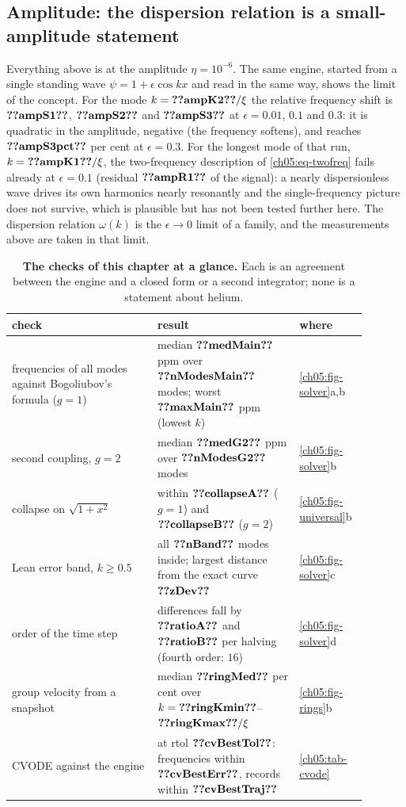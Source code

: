 \subsection{Amplitude: the dispersion relation is a small-amplitude statement}
Everything above is at the amplitude $\eta=10^{-6}$.
The same engine, started from a single standing wave $\psi=1+\epsilon\cos kx$ and read in the same way, shows the limit of the concept.
For the mode $k=\cfiveV{ampK2}/\xi$ the relative frequency shift is $\cfiveV{ampS1}$, $\cfiveV{ampS2}$ and $\cfiveV{ampS3}$ at $\epsilon=0.01$, $0.1$ and $0.3$: it is quadratic in the amplitude, negative (the frequency softens), and reaches $\cfiveV{ampS3pct}$ per cent at $\epsilon=0.3$.
For the longest mode of that run, $k=\cfiveV{ampK1}/\xi$, the two-frequency description of \cref{ch05:eq-twofreq} fails already at $\epsilon=0.1$ (residual $\cfiveV{ampR1}$ of the signal): a nearly dispersionless wave drives its own harmonics nearly resonantly and the single-frequency picture does not survive, which is plausible but has not been tested further here.
The dispersion relation $\omega(k)$ is the $\epsilon\to0$ limit of a family, and the measurements above are taken in that limit.

\begin{table}[tp]
\centering\small
\begin{tabular}{p{0.38\linewidth}p{0.37\linewidth}p{0.14\linewidth}}\toprule
check & result & where\\\midrule
frequencies of all modes against Bogoliubov's formula ($g=1$) & median $\cfiveV{medMain}$ ppm over $\cfiveV{nModesMain}$ modes; worst $\cfiveV{maxMain}$ ppm (lowest $k$) & \cref{ch05:fig-solver}a,b\\
second coupling, $g=2$ & median $\cfiveV{medG2}$ ppm over $\cfiveV{nModesG2}$ modes & \cref{ch05:fig-solver}b\\
collapse on $\sqrt{1+x^2}$ & within $\cfiveV{collapseA}$ ($g=1$) and $\cfiveV{collapseB}$ ($g=2$) & \cref{ch05:fig-universal}b\\
Lean error band, $k\ge0.5$ & all $\cfiveV{nBand}$ modes inside; largest distance from the exact curve $\cfiveV{zDev}$ & \cref{ch05:fig-solver}c\\
order of the time step & differences fall by $\cfiveV{ratioA}$ and $\cfiveV{ratioB}$ per halving (fourth order: $16$) & \cref{ch05:fig-solver}d\\
group velocity from a snapshot & median $\cfiveV{ringMed}$ per cent over $k=\cfiveV{ringKmin}$--$\cfiveV{ringKmax}/\xi$ & \cref{ch05:fig-rings}b\\
CVODE against the engine & at rtol $\cfiveV{cvBestTol}$: frequencies within $\cfiveV{cvBestErr}$, records within $\cfiveV{cvBestTraj}$ & \cref{ch05:tab-cvode}\\
\bottomrule
\end{tabular}
\caption{\textbf{The checks of this chapter at a glance.} Each is an agreement between the engine and a closed form or a second integrator; none is a statement about helium.}\label{ch05:tab-checks}
\end{table}

